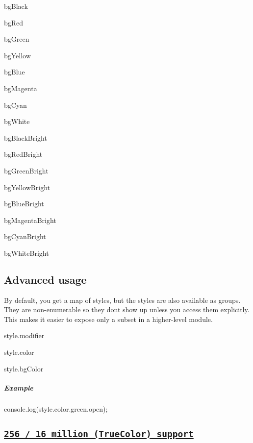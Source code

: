 \begin{DoxyItemize}
\item {\ttfamily bg\+Black}
\item {\ttfamily bg\+Red}
\item {\ttfamily bg\+Green}
\item {\ttfamily bg\+Yellow}
\item {\ttfamily bg\+Blue}
\item {\ttfamily bg\+Magenta}
\item {\ttfamily bg\+Cyan}
\item {\ttfamily bg\+White}
\item {\ttfamily bg\+Black\+Bright}
\item {\ttfamily bg\+Red\+Bright}
\item {\ttfamily bg\+Green\+Bright}
\item {\ttfamily bg\+Yellow\+Bright}
\item {\ttfamily bg\+Blue\+Bright}
\item {\ttfamily bg\+Magenta\+Bright}
\item {\ttfamily bg\+Cyan\+Bright}
\item {\ttfamily bg\+White\+Bright}
\end{DoxyItemize}

\subsection*{Advanced usage}

By default, you get a map of styles, but the styles are also available as groups. They are non-\/enumerable so they don\textquotesingle{}t show up unless you access them explicitly. This makes it easier to expose only a subset in a higher-\/level module.


\begin{DoxyItemize}
\item {\ttfamily style.\+modifier}
\item {\ttfamily style.\+color}
\item {\ttfamily style.\+bg\+Color}
\end{DoxyItemize}

\subparagraph*{Example}


\begin{DoxyCode}
console.log(style.color.green.open);
\end{DoxyCode}


\subsection*{\href{https://gist.github.com/XVilka/8346728}{\tt 256 / 16 million (True\+Color) support}}

